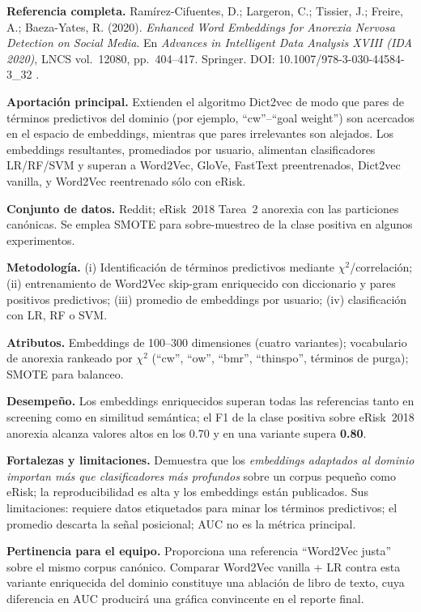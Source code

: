 \documentclass[journal]{IEEEtran}
\begin{document}
\textbf{Referencia completa.} Ramírez-Cifuentes, D.; Largeron, C.; Tissier, J.; Freire, A.; Baeza-Yates, R. (2020). \emph{Enhanced Word Embeddings for Anorexia Nervosa Detection on Social Media}. En \textit{Advances in Intelligent Data Analysis XVIII (IDA 2020)}, LNCS vol.~12080, pp.~404--417. Springer. DOI: 10.1007/978-3-030-44584-3\_32 \cite{ramirez2020enhanced}.

\textbf{Aportación principal.} Extienden el algoritmo Dict2vec de modo que pares de términos predictivos del dominio (por ejemplo, ``cw''--``goal weight'') son acercados en el espacio de embeddings, mientras que pares irrelevantes son alejados. Los embeddings resultantes, promediados por usuario, alimentan clasificadores LR/RF/SVM y superan a Word2Vec, GloVe, FastText preentrenados, Dict2vec vanilla, y Word2Vec reentrenado sólo con eRisk.

\textbf{Conjunto de datos.} Reddit; eRisk~2018 Tarea~2 anorexia con las particiones canónicas. Se emplea SMOTE para sobre-muestreo de la clase positiva en algunos experimentos.

\textbf{Metodología.} (i) Identificación de términos predictivos mediante $\chi^2$/correlación; (ii) entrenamiento de Word2Vec skip-gram enriquecido con diccionario y pares positivos predictivos; (iii) promedio de embeddings por usuario; (iv) clasificación con LR, RF o SVM.

\textbf{Atributos.} Embeddings de 100--300 dimensiones (cuatro variantes); vocabulario de anorexia rankeado por $\chi^2$ (``cw'', ``ow'', ``bmr'', ``thinspo'', términos de purga); SMOTE para balanceo.

\textbf{Desempeño.} Los embeddings enriquecidos superan todas las referencias tanto en screening como en similitud semántica; el F1 de la clase positiva sobre eRisk~2018 anorexia alcanza valores altos en los 0.70 y en una variante supera \textbf{0.80}.

\textbf{Fortalezas y limitaciones.} Demuestra que los \emph{embeddings adaptados al dominio importan más que clasificadores más profundos} sobre un corpus pequeño como eRisk; la reproducibilidad es alta y los embeddings están publicados. Sus limitaciones: requiere datos etiquetados para minar los términos predictivos; el promedio descarta la señal posicional; AUC no es la métrica principal.

\textbf{Pertinencia para el equipo.} Proporciona una referencia ``Word2Vec justa'' sobre el mismo corpus canónico. Comparar Word2Vec vanilla + LR contra esta variante enriquecida del dominio constituye una ablación de libro de texto, cuya diferencia en AUC producirá una gráfica convincente en el reporte final.
\end{document}
